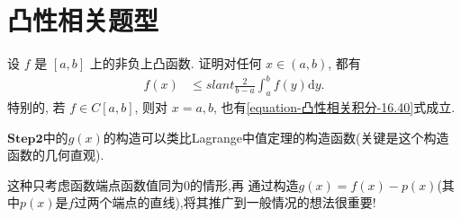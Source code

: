 \documentclass[../../main.tex]{subfiles}
\begin{document}
\section{凸性相关题型}

\begin{example}
设 $f$ 是 $[a,b]$ 上的非负上凸函数. 证明对任何 $x \in (a,b)$, 都有
\begin{align}\label{equation-凸性相关积分-16.40}
f(x) &\leqslant slant \frac{2}{b - a}\int_{a}^{b}f(y)\mathrm{d}y.
\end{align}
特别的, 若 $f \in C[a,b]$, 则对 $x = a,b$, 也有\eqref{equation-凸性相关积分-16.40}式成立.
\end{example}
\begin{remark}
$\mathbf{Step}\mathbf{2}$中的$g(x)$的构造可以类比Lagrange中值定理的构造函数(关键是这个构造函数的几何直观).
\end{remark}
\begin{note}
这种只考虑函数端点函数值同为0的情形,再
通过构造$g(x)=f(x)-p(x)$(其中$p(x)$是$f$过两个端点的直线),将其推广到一般情况的想法很重要!
\end{note}
\end{document}
